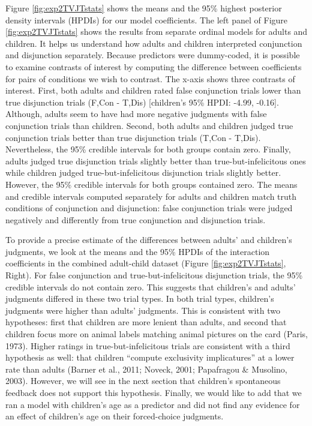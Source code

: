 \documentclass[,man,floatsintext]{apa6}
\begin{document}
Figure \ref{fig:exp2TVJTstats} shows the means and the 95\% highest posterior density intervals (HPDIs) for our model coefficients. The left panel of Figure \ref{fig:exp2TVJTstats} shows the results from separate ordinal models for adults and children. It helps us understand how adults and children interpreted conjunction and disjunction separately. Because predictors were dummy-coded, it is possible to examine contrasts of interest by computing the difference between coefficients for pairs of conditions we wish to contrast. The x-axis shows three contrasts of interest. First, both adults and children rated false conjunction trials lower than true disjunction trials (F,Con - T,Dis) {[}children's 95\% HPDI: -4.99,
-0.16{]}. Although, adults seem to have had more negative judgments with false conjunction trials than children. Second, both adults and children judged true conjunction trials better than true disjunction trials (T,Con - T,Dis). Nevertheless, the 95\% credible intervals for both groups contain zero. Finally, adults judged true disjunction trials slightly better than true-but-infelicitous ones while children judged true-but-infelicitous disjunction trials slightly better. However, the 95\% credible intervals for both groups contained zero. The means and credible intervals computed separately for adults and children match truth conditions of conjunction and disjunction: false conjunction trials were judged negatively and differently from true conjunction and disjunction trials.

To provide a precise estimate of the differences between adults' and children's judgments, we look at the means and the 95\% HPDIs of the interaction coefficients in the combined adult-child dataset (Figure \ref{fig:exp2TVJTstats}, Right). For false conjunction and true-but-infelicitous disjunction trials, the 95\% credible intervals do not contain zero. This suggests that children's and adults' judgments differed in these two trial types. In both trial types, children's judgments were higher than adults' judgments. This is consistent with two hypotheses: first that children are more lenient than adults, and second that children focus more on animal labels matching animal pictures on the card (Paris, 1973). Higher ratings in true-but-infelicitous trials are consistent with a third hypothesis as well: that children \enquote{compute exclusivity implicatures} at a lower rate than adults (Barner et al., 2011; Noveck, 2001; Papafragou \& Musolino, 2003). However, we will see in the next section that children's spontaneous feedback does not support this hypothesis. Finally, we would like to add that we ran a model with children's age as a predictor and did not find any evidence for an effect of children's age on their forced-choice judgments.
\end{document}
